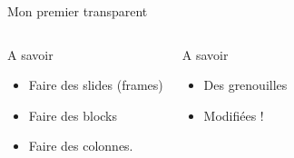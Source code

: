 \documentclass[a4paper, dvipsnames]{beamer}
\begin{document}
\begin{frame}{Mon premier transparent}
\begin{columns}[c]
		\begin{block}{A savoir}
			\begin{itemize}
				\item Faire des slides (frames)
				\item Faire des blocks
				\item Faire des colonnes.
			\end{itemize}
		\end{block}
		\begin{alertblock}{A savoir}
			\begin{itemize}
				\item <1-> Des grenouilles
				\item <2->Modifiées !
			\end{itemize}
		\end{alertblock}
	\end{columns}
\end{frame} 
\end{document}
